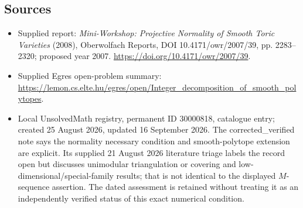 \documentclass[11pt]{article}
\begin{document}
\subsection{Sources}
\begin{itemize}
\item Supplied report: \emph{Mini-Workshop: Projective Normality of Smooth Toric Varieties} (2008), Oberwolfach Reports, DOI 10.4171/owr/2007/39, pp. 2283--2320; proposed year 2007. \url{https://doi.org/10.4171/owr/2007/39}.
\item Supplied Egres open-problem summary: \url{https://lemon.cs.elte.hu/egres/open/Integer_decomposition_of_smooth_polytopes}.
\item Local UnsolvedMath registry, permanent ID 30000818, catalogue entry; created 25 August 2026, updated 16 September 2026. The corrected\_verified note says the normality necessary condition and smooth-polytope extension are explicit. Its supplied 21 August 2026 literature triage labels the record open but discusses unimodular triangulation or covering and low-dimensional/special-family results; that is not identical to the displayed $M$-sequence assertion. The dated assessment is retained without treating it as an independently verified status of this exact numerical condition.
\end{itemize}
\end{document}
